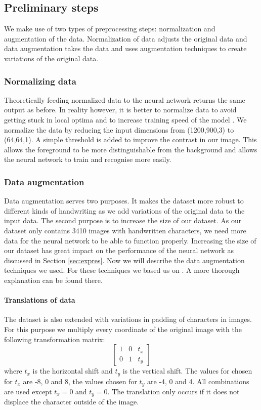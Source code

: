 \documentclass{article}
\begin{document}
\subsection{Preliminary steps}
\label{sec:preproc}
We make use of two types of preprocessing steps: normalization and augmentation of the data. Normalization of data adjusts the original data and data augmentation takes the data and uses augmentation techniques to create variations of the original data.

\subsubsection{Normalizing data} 
\label{par:norm}
Theoretically feeding normalized data to the neural network returns the same output as before. 
In reality however, it is better to normalize data to avoid getting stuck in local optima and to increase training speed of the model \cite{NormGoal}.
We normalize the data by reducing the input dimensions from (1200,900,3) to (64,64,1). A simple threshold is added to improve the contrast in our image. 
This allows the foreground to be more distinguishable from the background and allows the neural network to train and recognise more easily. 

\subsubsection{Data augmentation}
\label{par:aug}
Data augmentation serves two purposes. It makes the dataset more robust to different kinds of handwriting as we add variations of the original data to the input data. 
The second purpose is to increase the size of our dataset. As our dataset only contains 3410 images with handwritten characters, we need more data for the neural network to be able to function properly. 
Increasing the size of our dataset has great impact on the performance of the neural network as discussed in Section \ref{sec:expres}. Now we will describe the data augmentation techniques we used. For these techniques we based us on \cite{DataAug}. A more thorough explanation can be found there. 

\paragraph{Translations of data}
The dataset is also extended with variations in padding of characters in images. For this purpose we multiply every coordinate of the original image with the following transformation matrix: 
\begin{equation}
        \begin{bmatrix}
                1 & 0 & t_x \\
                0 & 1 & t_y
        \end{bmatrix}
\end{equation}
where $t_x$ is the horizontal shift and $t_y$ is the vertical shift. The values for chosen for $t_x$ are -8, 0 and 8, the values chosen for $t_y$ are -4, 0 and 4. All combinations are used except $t_x=0$ and $t_y=0$. The translation only occurs if it does not displace the character outside of the image.
\end{document}
